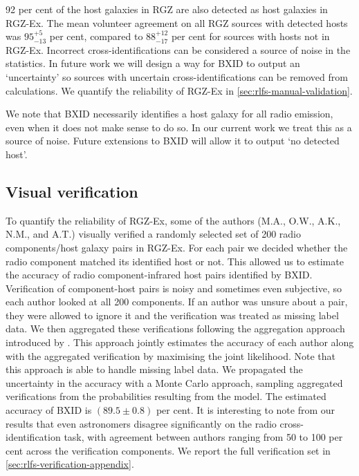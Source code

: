 92 per cent of the host galaxies in RGZ are also detected as host galaxies in RGZ-Ex. The mean volunteer agreement on all RGZ sources with detected hosts was $95^{+5}_{-13}$ per cent, compared to $88^{+12}_{-17}$ per cent for sources with hosts not in RGZ-Ex. Incorrect cross-identifications can be considered a source of noise in the statistics. In future work we will design a way for BXID to output an `uncertainty' so sources with uncertain cross-identifications can be removed from calculations. We quantify the reliability of RGZ-Ex in \autoref{sec:rlfs-manual-validation}.

We note that BXID necessarily identifies a host galaxy for all radio emission, even when it does not
make sense to do so. In our current work we treat this as a source of
noise. Future extensions to BXID will allow it to output `no detected
host'.

    \subsection{Visual verification}\label{sec:rlfs-manual-validation}

    To quantify the reliability of RGZ-Ex, some of the authors (M.A., O.W., A.K., N.M., and A.T.) visually verified a randomly selected set of 200 radio components/host galaxy pairs in RGZ-Ex. For each pair we decided whether the radio component matched its identified host or not. This allowed us to estimate the accuracy of radio component-infrared host pairs identified by BXID. Verification of component-host pairs is noisy and sometimes even subjective, so each author looked at all 200 components. If an author was unsure about a pair, they were allowed to ignore it and the verification was treated as missing label data. We then aggregated these verifications following the aggregation approach introduced by \citet{dawid79em}. This approach jointly estimates the accuracy of each author along with the aggregated verification by maximising the joint likelihood. Note that this approach is able to handle missing label data. We propagated the uncertainty in the accuracy with a Monte Carlo approach, sampling aggregated verifications from the probabilities resulting from the \citeauthor{dawid79em} model. The estimated accuracy of BXID is $(89.5 \pm 0.8)$ per cent. It is interesting to note from our results that even astronomers disagree significantly on the radio cross-identification task, with agreement between authors ranging from 50 to 100 per cent across the verification components. We report the full verification set in \autoref{sec:rlfs-verification-appendix}.

